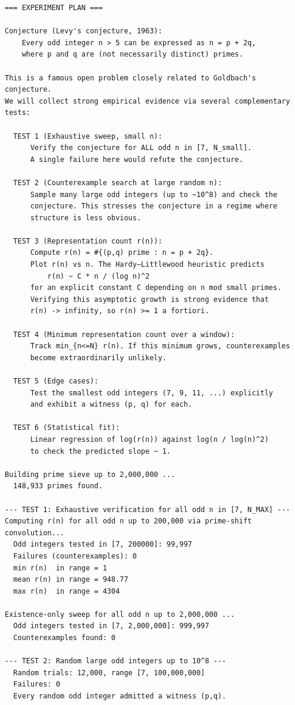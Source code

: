 \documentclass[11pt]{article}
\begin{document}
\begin{lstlisting}
=== EXPERIMENT PLAN ===

Conjecture (Levy's conjecture, 1963):
    Every odd integer n > 5 can be expressed as n = p + 2q,
    where p and q are (not necessarily distinct) primes.

This is a famous open problem closely related to Goldbach's conjecture.
We will collect strong empirical evidence via several complementary tests:

  TEST 1 (Exhaustive sweep, small n):
      Verify the conjecture for ALL odd n in [7, N_small].
      A single failure here would refute the conjecture.

  TEST 2 (Counterexample search at large random n):
      Sample many large odd integers (up to ~10^8) and check the
      conjecture. This stresses the conjecture in a regime where
      structure is less obvious.

  TEST 3 (Representation count r(n)):
      Compute r(n) = #{(p,q) prime : n = p + 2q}.
      Plot r(n) vs n. The Hardy–Littlewood heuristic predicts
          r(n) ~ C * n / (log n)^2
      for an explicit constant C depending on n mod small primes.
      Verifying this asymptotic growth is strong evidence that
      r(n) -> infinity, so r(n) >= 1 a fortiori.

  TEST 4 (Minimum representation count over a window):
      Track min_{n<=N} r(n). If this minimum grows, counterexamples
      become extraordinarily unlikely.

  TEST 5 (Edge cases):
      Test the smallest odd integers (7, 9, 11, ...) explicitly
      and exhibit a witness (p, q) for each.

  TEST 6 (Statistical fit):
      Linear regression of log(r(n)) against log(n / log(n)^2)
      to check the predicted slope ~ 1.

Building prime sieve up to 2,000,000 ...
  148,933 primes found.

--- TEST 1: Exhaustive verification for all odd n in [7, N_MAX] ---
Computing r(n) for all odd n up to 200,000 via prime-shift convolution...
  Odd integers tested in [7, 200000]: 99,997
  Failures (counterexamples): 0
  min r(n)  in range = 1
  mean r(n) in range = 948.77
  max r(n)  in range = 4304

Existence-only sweep for all odd n up to 2,000,000 ...
  Odd integers tested in [7, 2,000,000]: 999,997
  Counterexamples found: 0

--- TEST 2: Random large odd integers up to 10^8 ---
  Random trials: 12,000, range [7, 100,000,000]
  Failures: 0
  Every random odd integer admitted a witness (p,q).


\end{lstlisting}
\end{document}
